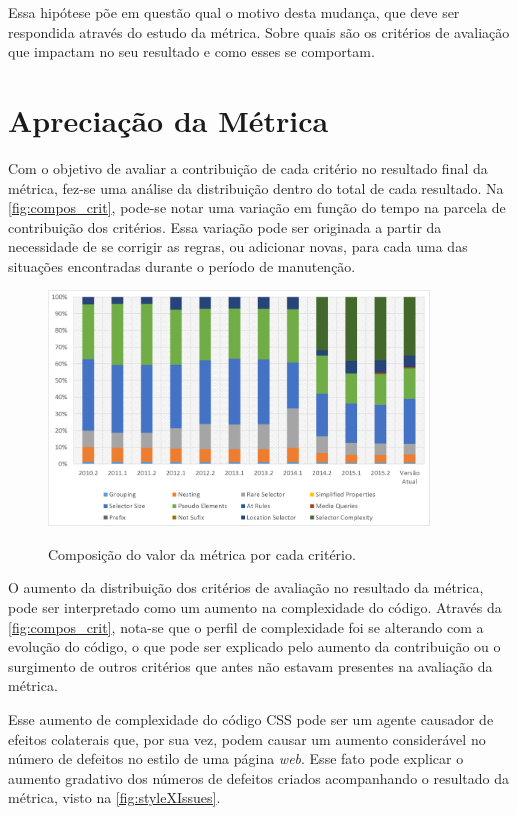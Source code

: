 Essa hipótese põe em questão qual o motivo desta mudança, que deve ser respondida através do estudo da métrica. Sobre quais são os critérios de avaliação que impactam no seu resultado e como esses se comportam. 

\section{Apreciação da Métrica}

Com o objetivo de avaliar a contribuição de cada critério no resultado final da métrica, fez-se uma análise da distribuição dentro do total de cada resultado. Na \autoref{fig:compos_crit}, pode-se notar uma variação em função do tempo na parcela de contribuição dos critérios. Essa variação pode ser originada a partir da necessidade de se corrigir as regras, ou adicionar novas, para cada uma das situações encontradas durante o período de manutenção.


\begin{figure}[!htb]
	\centering
	\caption{Composição do valor da métrica por cada critério.}
	\includegraphics[width=0.9\textwidth]{./04-figuras/composition_criteria}
	\label{fig:compos_crit}
\end{figure}

O aumento da distribuição dos critérios de avaliação no resultado da métrica, pode ser interpretado como um aumento na complexidade do código.  Através da \autoref{fig:compos_crit}, nota-se que o perfil de complexidade foi se alterando com a evolução do código, o que pode ser explicado pelo aumento da contribuição ou o surgimento de outros critérios que antes não estavam presentes na avaliação da métrica.

Esse aumento de complexidade do código CSS pode ser um agente causador de efeitos colaterais que, por sua vez, podem causar um aumento considerável no número de defeitos no estilo de uma página \textit{web}. Esse fato pode explicar o aumento gradativo dos números de defeitos criados acompanhando o resultado da métrica, visto na \autoref{fig:styleXIssues}.

